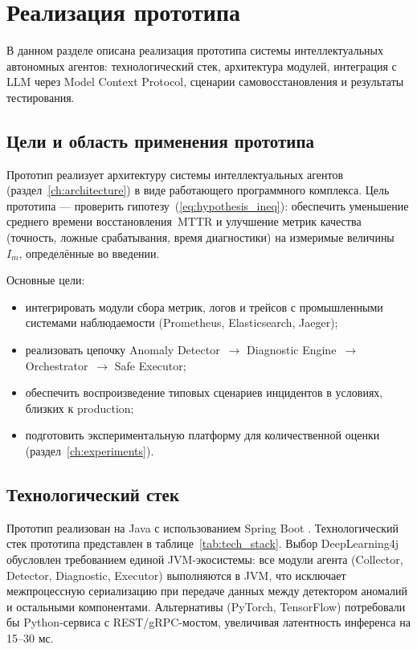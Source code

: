 \chapter{Реализация прототипа}\label{ch:prototype}

В данном разделе описана реализация прототипа системы интеллектуальных автономных агентов: технологический стек, архитектура модулей, интеграция с LLM через Model Context Protocol, сценарии самовосстановления и результаты тестирования.

\section{Цели и область применения прототипа}

Прототип реализует архитектуру системы интеллектуальных агентов (раздел~\ref{ch:architecture}) в виде работающего программного комплекса. Цель прототипа --- проверить гипотезу~(\ref{eq:hypothesis_ineq}): обеспечить уменьшение среднего времени восстановления~$\text{MTTR}$ и улучшение метрик качества (точность, ложные срабатывания, время диагностики) на измеримые величины~$I_m$, определённые во введении.

Основные цели:
\begin{itemize}
  \item интегрировать модули сбора метрик, логов и трейсов с промышленными системами наблюдаемости (Prometheus, Elasticsearch, Jaeger);
  \item реализовать цепочку Anomaly Detector~$\to$ Diagnostic Engine~$\to$ \linebreak Orchestrator~$\to$ Safe Executor;
  \item обеспечить воспроизведение типовых сценариев инцидентов в условиях, близких к production;
  \item подготовить экспериментальную платформу для количественной оценки (раздел~\ref{ch:experiments}).

\end{itemize}

\section{Технологический стек}

Прототип реализован на Java с использованием Spring Boot \cite{spring_framework}. Технологический стек прототипа представлен в таблице~\ref{tab:tech_stack}. Выбор DeepLearning4j обусловлен требованием единой JVM-\linebreak экосистемы: все модули агента (Collector, Detector, Diagnostic, Executor) выполняются в JVM, что исключает межпроцессную сериализацию при передаче данных между детектором аномалий и остальными компонентами. Альтернативы (PyTorch, TensorFlow) потребовали бы Python-сервиса с REST/gRPC-мостом, увеличивая латентность инференса на 15--30 мс.

